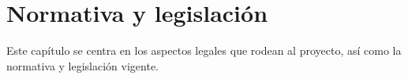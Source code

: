 \chapter{Normativa y legislación}
Este capítulo se centra en los aspectos legales que rodean al proyecto, así como la normativa y legislación vigente.


